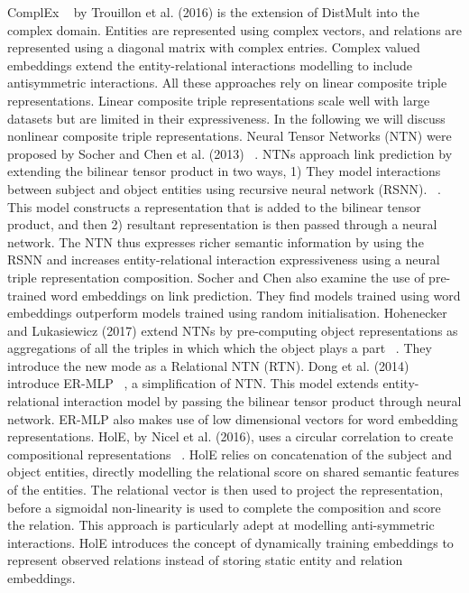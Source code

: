 ComplEx ~\citep{trouillon2016complex} by Trouillon et al. (2016) is the extension of DistMult into the complex domain. Entities are represented using complex vectors, and relations are represented using a diagonal matrix with complex entries. Complex valued embeddings extend the entity-relational interactions modelling to include antisymmetric interactions. \newline
All these approaches rely on linear composite triple representations. Linear composite triple representations scale well with large datasets but are limited in their expressiveness. In the following we will discuss nonlinear composite triple representations. \newline
Neural Tensor Networks (NTN) were proposed by Socher and Chen et al. (2013) ~\citep{socher2013reasoning}. NTNs approach link prediction by extending the bilinear tensor product in two ways, 1) They model interactions between subject and object entities using recursive neural network (RSNN). ~\citep{socher2012semantic}. This model constructs a representation that is added to the bilinear tensor product, and then 2) resultant representation is then passed through a neural network. The NTN thus expresses richer semantic information by using the RSNN and increases entity-relational interaction expressiveness using a neural triple representation composition. Socher and Chen also examine the use of pre-trained word embeddings on link prediction. They find models trained using word embeddings outperform models trained using random initialisation. \newline
Hohenecker and Lukasiewicz (2017) extend NTNs by pre-computing object representations as aggregations of all the triples in which which the object plays a part ~\citep{hohenecker2017deep}. They introduce the new mode as a Relational NTN (RTN). Dong et al. (2014) introduce ER-MLP ~\citep{dong2014knowledge, nickel2015review}, a simplification of NTN. This model extends entity-relational interaction model by passing the bilinear tensor product through neural network. ER-MLP also makes use of low dimensional vectors for word embedding representations. \newline 
HolE, by Nicel et al. (2016), uses a  circular correlation to create compositional representations ~\citep{nickel2016holographic}. HolE relies on concatenation of the subject and object entities, directly modelling the relational score on shared semantic features of the entities. The relational vector is then used to project the representation, before a sigmoidal non-linearity is used to complete the composition and score the relation. This approach is particularly adept at modelling anti-symmetric interactions. HolE introduces the concept of dynamically training embeddings to represent observed relations instead of storing static entity and relation embeddings. \newline
